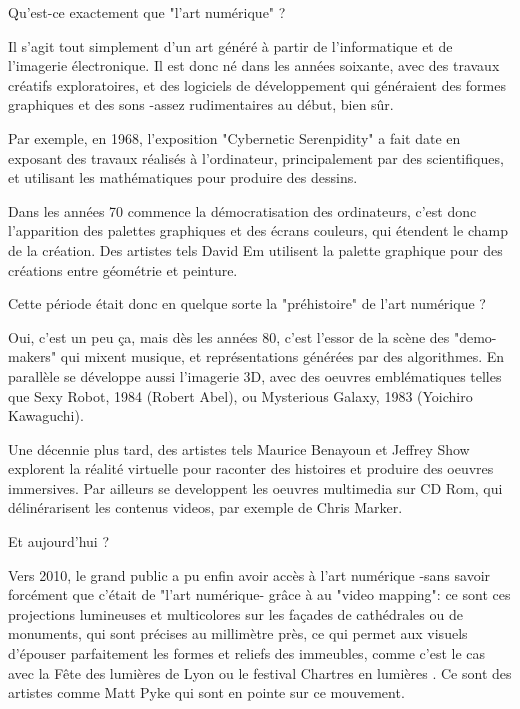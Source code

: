 
\begin{His}

\vspace{0.4cm}

{\color{brown}Qu'est-ce exactement que "l'art numérique" ?}

\vspace{0.4cm}

Il s'agit tout simplement d'un art généré à partir de l'informatique et de l'imagerie électronique. Il est donc né dans les années soixante, avec des travaux créatifs exploratoires, et des logiciels de développement qui généraient des formes graphiques et des sons -assez rudimentaires au début, bien sûr.

Par exemple,  en 1968, l'exposition "Cybernetic Serenpidity" a fait date en exposant des travaux réalisés à l'ordinateur, principalement par des scientifiques, et utilisant les mathématiques pour produire des dessins.

Dans les années 70 commence la démocratisation des ordinateurs, c'est donc l'apparition des palettes graphiques et des écrans couleurs, qui étendent le champ de la création. Des artistes tels David Em utilisent la palette graphique pour des créations entre géométrie et peinture.

Cette période était donc en quelque sorte la "préhistoire" de l'art numérique ?

Oui, c'est un peu ça, mais dès les années 80, c'est l'essor de la scène des "demo-makers" qui mixent musique, et représentations générées par des algorithmes. En parallèle se développe aussi l'imagerie 3D, avec des oeuvres emblématiques telles que Sexy Robot, 1984 (Robert Abel), ou Mysterious Galaxy, 1983 (Yoichiro Kawaguchi).

Une décennie plus tard, des artistes tels Maurice Benayoun et Jeffrey Show explorent la réalité virtuelle pour raconter des histoires et produire des oeuvres immersives.  Par ailleurs se developpent les oeuvres multimedia sur CD Rom, qui délinérarisent les contenus videos, par exemple de Chris Marker.

\vspace{0.4cm}

{\color{brown}Et aujourd'hui ?}

\vspace{0.4cm}
Vers 2010, le grand public a pu enfin avoir accès à l'art numérique -sans savoir forcément que c'était de "l'art numérique- grâce à au "video mapping": ce sont ces projections lumineuses et multicolores sur les façades de cathédrales ou de monuments, qui sont précises au millimètre près, ce qui permet aux visuels d'épouser parfaitement les formes et reliefs des immeubles, comme c'est le cas avec la Fête des lumières de Lyon  ou le festival Chartres en lumières . Ce sont des artistes comme Matt Pyke qui sont en pointe sur ce mouvement.


\end{His}
